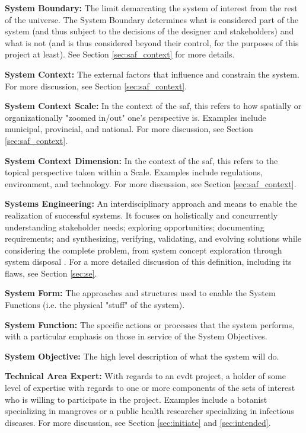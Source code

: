 \textbf{System Boundary:} The limit demarcating the system of interest from the rest of the universe. The System Boundary determines what is considered part of the system (and thus subject to the decisions of the designer and stakeholders) and what is not (and is thus considered beyond their control, for the purposes of this project at least). See Section \ref{sec:saf_context} for more details.

\textbf{System Context:} The external factors that influence and constrain the system. For more discussion, see Section \ref{sec:saf_context}.

\textbf{System Context Scale:} In the context of the \ac{saf}, this refers to how spatially or organizationally "zoomed in/out" one's perspective is. Examples include municipal, provincial, and national. For more discussion, see Section \ref{sec:saf_context}.

\textbf{System Context Dimension:} In the context of the \ac{saf}, this refers to the topical perspective taken within a Scale. Examples include regulations, environment, and technology. For more discussion, see Section \ref{sec:saf_context}.

\textbf{Systems Engineering:} An interdisciplinary approach and means to enable the realization of successful systems. It focuses on holistically and concurrently understanding stakeholder needs; exploring opportunities; documenting requirements; and synthesizing, verifying, validating, and evolving solutions while considering the complete problem, from system concept exploration through system disposal \cite{systemsengineeringbodyofknowledgeSystemsEngineeringGlossary2021}. 
For a more detailed discussion of this definition, including its flaws, see Section \ref{sec:se}.

\textbf{System Form:} The approaches and structures used to enable the System Functions (i.e. the physical "stuff" of the system).

\textbf{System Function:} The specific actions or processes that the system performs, with a particular emphasis on those in service of the System Objectives.

\textbf{System Objective:} The high level description of what the system will do.

\textbf{Technical Area Expert:} With regards to an \ac{evdt} project, a holder of some level of expertise with regards to one or more components of the \ac{sets} of interest who is willing to participate in the project. Examples include a botanist specializing in mangroves or a public health researcher specializing in infectious diseases. For more discussion, see Section \ref{sec:initiate} and \ref{sec:intended}.

